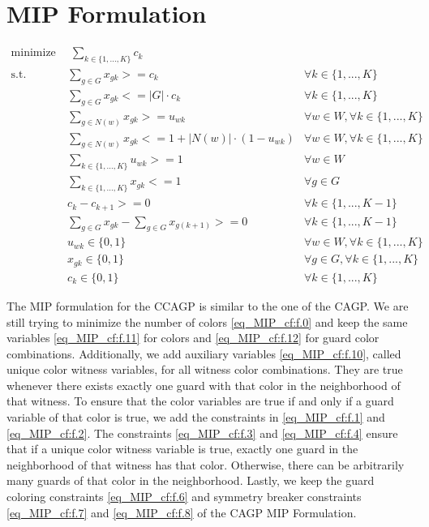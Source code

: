 \section{MIP Formulation}

\begin{align}
\label{eq_MIP_cf:f.0} \mbox{minimize}~& \;\sum_{k\in \{1,...,K\}} c_{k}& \\
\label{eq_MIP_cf:f.1} \mbox{s.t. } &\sum_{g \in G}x_{gk} >= c_{k} & \forall k\in \{1,...,K\}\\
\label{eq_MIP_cf:f.2}&\sum_{g\in G}x_{gk} <= |G|\cdot  c_{k} & \forall k\in \{1,...,K\}\\
\label{eq_MIP_cf:f.3}&\sum_{g\in N(w)}x_{gk} >= u_{wk} & \forall w\in W, \forall k\in \{1,...,K\}\\
\label{eq_MIP_cf:f.4}&\sum_{g\in N(w)}x_{gk} <= 1 + |N(w)|\cdot  (1-u_{wk}) & \forall w\in W, \forall k\in \{1,...,K\}\\
\label{eq_MIP_cf:f.5}&\sum_{k\in \{1,...,K\}}u_{wk} >= 1 & \forall w\in W\\
\label{eq_MIP_cf:f.6}&\sum_{k\in \{1,...,K\}}x_{gk} <= 1 & \forall g\in G\\
\label{eq_MIP_cf:f.7}&c_{k} - c_{k+1} >= 0 & \forall k\in \{1,...,K-1\}\\
\label{eq_MIP_cf:f.8}&\sum_{g\in G}x_{gk} - \sum_{g\in G}x_{g(k+1)} >= 0 & \forall k\in \{1,...,K-1\}\\
\label{eq_MIP_cf:f.10}& u_{wk} \in \{0,1\} & \forall w\in W, \forall k\in \{1,...,K\}\\
\label{eq_MIP_cf:f.11}& x_{gk} \in \{0,1\} & \forall g\in G, \forall k\in \{1,...,K\}\\
\label{eq_MIP_cf:f.12}& c_{k}\in \{0,1\} & \forall k\in \{1,...,K\}
\end{align}

The MIP formulation for the CCAGP is similar to the one of the CAGP. We are still trying to minimize the number of colors \cref{eq_MIP_cf:f.0} and keep the same variables \cref{eq_MIP_cf:f.11} for colors and \cref{eq_MIP_cf:f.12} for guard color combinations. Additionally, we add auxiliary variables \cref{eq_MIP_cf:f.10}, called unique color witness variables, for all witness color combinations. They are true whenever there exists exactly one guard with that color in the neighborhood of that witness. To ensure that the color variables are true if and only if a guard variable of that color is true, we add the constraints in \cref{eq_MIP_cf:f.1} and \cref{eq_MIP_cf:f.2}. The constraints \cref{eq_MIP_cf:f.3} and \cref{eq_MIP_cf:f.4} ensure that if a unique color witness variable is true, exactly one guard in the neighborhood of that witness has that color. Otherwise, there can be arbitrarily many guards of that color in the neighborhood. Lastly, we keep the guard coloring constraints \cref{eq_MIP_cf:f.6} and symmetry breaker constraints \cref{eq_MIP_cf:f.7} and \cref{eq_MIP_cf:f.8} of the CAGP MIP Formulation.

